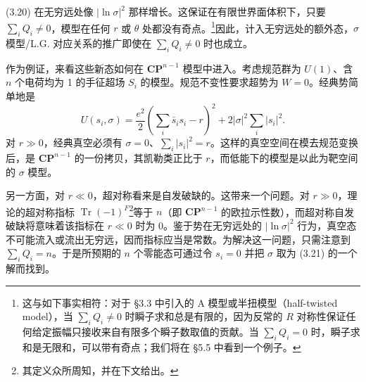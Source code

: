(3.20) 在无穷远处像 $|\ln\sigma|^2$ 那样增长。这保证在有限世界面体积下，只要 $\sum_iQ_i\neq0$，模型在任何 $r$ 或 $\theta$ 处都没有奇点。\footnote{这与如下事实相符：对于 §3.3 中引入的 A 模型或半扭模型（half-twisted model），当 $\sum_iQ_i\neq0$ 时瞬子求和总是有限的，因为反常的 $R$ 对称性保证任何给定振幅只接收来自有限多个瞬子数取值的贡献。当 $\sum_iQ_i=0$ 时，瞬子求和是无限和，可以带有奇点；我们将在 §5.5 中看到一个例子。}因此，计入无穷远处的额外态，$\sigma$ 模型/L.G. 对应关系的推广即使在 $\sum_iQ_i\neq0$ 时也成立。


作为例证，来看这些新态如何在 $\mathbf{CP}^{n-1}$ 模型中进入。考虑规范群为 $U(1)$、含 $n$ 个电荷均为 1 的手征超场 $S_i$ 的模型。规范不变性要求超势为 $W=0$。经典势简单地是
\begin{equation}\tag{3.23}
U(s_i,\sigma)=\frac{e^2}{2}\left(\sum_i\bar s_is_i-r\right)^2+2|\sigma|^2\sum_i|s_i|^2.
\end{equation}
对 $r\gg0$，经典真空必须有 $\sigma=0$、$\sum_i|s_i|^2=r$。这样的真空空间在模去规范变换后，是 $\mathbf{CP}^{n-1}$ 的一份拷贝，其凯勒类正比于 $r$，而低能下的模型是以此为靶空间的 $\sigma$ 模型。


\label{op:28}
另一方面，对 $r\ll0$，超对称看来是自发破缺的。这带来一个问题。对 $r\gg0$，理论的超对称指标 $\operatorname{Tr}(-1)^F$\footnote{其定义众所周知，并在下文给出。}等于 $n$（即 $\mathbf{CP}^{n-1}$ 的欧拉示性数），而超对称自发破缺将意味着该指标在 $r\ll0$ 时为 0。鉴于势在无穷远处的 $|\ln\sigma|^2$ 行为，真空态不可能流入或流出无穷远，因而指标应当是常数。为解决这一问题，只需注意到 $\sum_iQ_i=n$。于是所预期的 $n$ 个零能态可通过令 $s_i=0$ 并把 $\sigma$ 取为 (3.21) 的一个解而找到。

